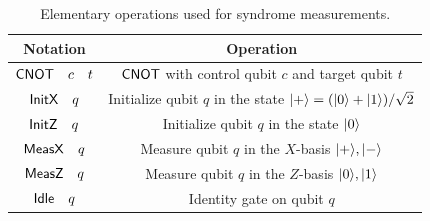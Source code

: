 \documentclass{article}
\begin{document}
\begin{table}[t]
\begin{center}
\begin{tabular}{c|c}
\hline
Notation & Operation  \\
\hline
\hline
$\mathsf{CNOT}\quad {c} \quad {t}$  & $\mathsf{CNOT}$ with control qubit $c$ and target qubit $t$ \\
\hline
$\mathsf{InitX} \quad {q}$  & Initialize qubit $q$ in the state $|+\rangle=(|0\rangle+|1\rangle)/\sqrt{2}$\\
\hline
$\mathsf{InitZ} \quad {q}$ &  Initialize qubit $q$ in the state $|0\rangle$\\
\hline
$\mathsf{MeasX} \quad {q}$ & Measure qubit $q$ in the $X$-basis $|+\rangle,|-\rangle$\\
\hline
$\mathsf{MeasZ} \quad {q}$ & Measure qubit $q$ in the $Z$-basis $|0\rangle,|1\rangle$\\
\hline
$\mathsf{Idle} \quad {q}$ & Identity gate on qubit $q$  \\ 
\hline
\end{tabular}
\caption{Elementary operations used for syndrome measurements.}
\label{table:tab3}
\end{center}
\end{table}
\end{document}
